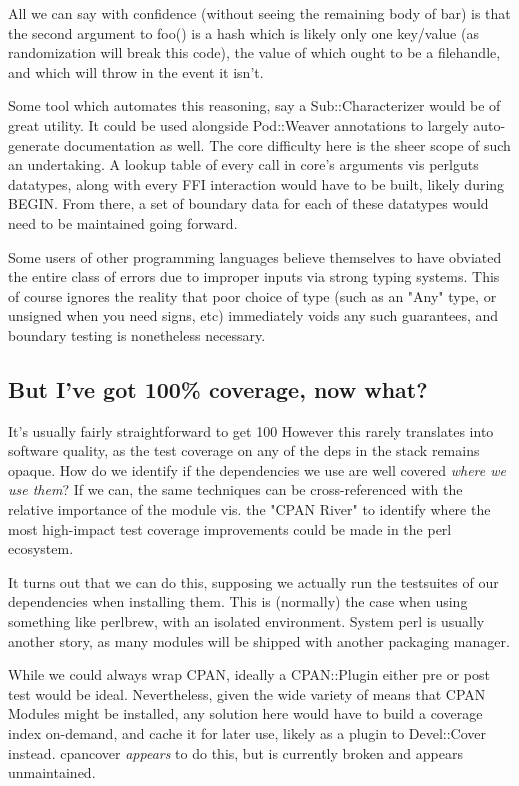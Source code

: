 \documentclass{article}
\begin{document}
All we can say with confidence (without seeing the remaining body of bar) is that the second argument to foo() is a hash which is likely only one key/value (as randomization will break this code), the value of which ought to be a filehandle, and which will throw in the event it isn't.

Some tool which automates this reasoning, say a Sub::Characterizer would be of great utility. It could be used alongside Pod::Weaver annotations to largely auto-generate documentation as well.
The core difficulty here is the sheer scope of such an undertaking.  A lookup table of every call in core's arguments vis perlguts datatypes, along with every FFI interaction would have to be built, likely during BEGIN.
From there, a set of boundary data for each of these datatypes would need to be maintained going forward.

Some users of other programming languages believe themselves to have obviated the entire class of errors due to improper inputs via strong typing systems.
This of course ignores the reality that poor choice of type (such as an "Any" type, or unsigned when you need signs, etc) immediately voids any such guarantees, and boundary testing is nonetheless necessary.

\subsection{But I've got 100\% coverage, now what?}

It's usually fairly straightforward to get 100%
However this rarely translates into software quality, as the test coverage on any of the deps in the stack remains opaque.
How do we identify if the dependencies we use are well covered \textit{where we use them}?
If we can, the same techniques can be cross-referenced with the relative importance of the module vis. the "CPAN River" to identify where the most high-impact test coverage improvements could be made in the perl ecosystem.

It turns out that we can do this, supposing we actually run the testsuites of our dependencies when installing them.
This is (normally) the case when using something like perlbrew, with an isolated environment.
System perl is usually another story, as many modules will be shipped with another packaging manager.

While we could always wrap CPAN, ideally a CPAN::Plugin either pre or post test would be ideal.
Nevertheless, given the wide variety of means that CPAN Modules might be installed, any solution here would have to build a coverage index on-demand, and cache it for later use, likely as a plugin to Devel::Cover instead.
cpancover \textit{appears} to do this, but is currently broken and appears unmaintained.
\end{document}
